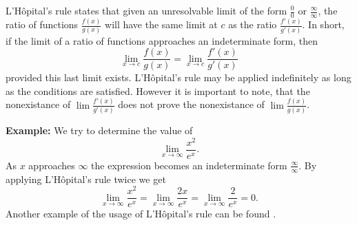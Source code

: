 \documentclass[12pt]{article}
\begin{document}
L'H\^opital's rule states that given an unresolvable limit of the form $\frac{0}{0}$ or $\frac{\infty}{\infty}$, the ratio of functions $\frac{f(x)}{g(x)}$ will have the same limit at $c$ as the ratio $\frac{f'(x)}{g'(x)}$. In short, if the limit of a ratio of functions approaches an indeterminate form, then
$$\lim_{x\rightarrow c}\frac{f(x)}{g(x)} = \lim_{x\rightarrow c}\frac{f'(x)}{g'(x)}$$
provided this last limit exists. L'H\^opital's rule may be applied indefinitely as long as the conditions are satisfied. However it is important to note, that the nonexistance of $\lim\frac{f'(x)}{g'(x)}$ does not prove the nonexistance of $\lim\frac{f(x)}{g(x)}$.

\textbf{Example:}
We try to determine the value of
$$\lim_{x\to \infty}\frac{x^2}{e^x}.$$
As $x$ approaches $\infty$ the expression becomes an indeterminate form $\frac{\infty}{\infty}$. By applying L'H\^opital's rule twice we get
$$\lim_{x\to\infty}\frac{x^2}{e^x}=\lim_{x\to \infty}\frac{2x}{e^x}=\lim_{x\to \infty}\frac{2}{e^x}=0.$$
Another example of the usage of L'H\^opital's rule can be found .



\end{document}

